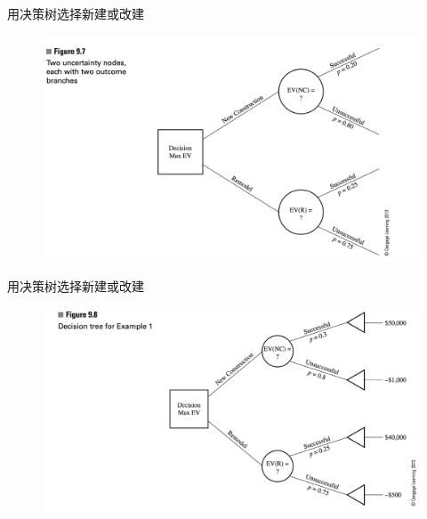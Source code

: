 \documentclass[UTF8]{ctexbeamer}
\begin{document}
\begin{frame}{用决策树选择新建或改建}
  
  \begin{figure}
    \centering
    \includegraphics[width=\textwidth{}]{9_7.png}
  \end{figure}

\end{frame}

\begin{frame}{用决策树选择新建或改建}
  
  \begin{figure}
    \centering
    \includegraphics[width=\textwidth{}]{9_8.png}
  \end{figure}

\end{frame}
\end{document}
